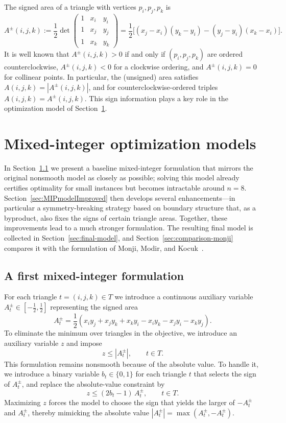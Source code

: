 \documentclass[11pt,a4paper]{article}
\theoremstyle{plain}
\theoremstyle{definition}
\theoremstyle{remark}
\begin{document}
The signed area of a triangle with vertices $p_i,p_j,p_k$ is
\[
  A^\pm(i,j,k)
  :=\frac{1}{2}\det\!\begin{pmatrix}
  1 & x_i & y_i\\
  1 & x_j & y_j\\
  1 & x_k & y_k
  \end{pmatrix}
  =\frac{1}{2}\bigl[(x_j-x_i)(y_k-y_i)-(y_j-y_i)(x_k-x_i)\bigr].
\]
It is well known that $A^\pm(i,j,k)>0$ if and only if $(p_i,p_j,p_k)$ are ordered counterclockwise,
$A^\pm(i,j,k)<0$ for a clockwise ordering, and $A^\pm(i,j,k)=0$ for collinear points.
In particular, the (unsigned) area satisfies $A(i,j,k)=|A^\pm(i,j,k)|$,
and for counterclockwise-ordered triples $A(i,j,k)=A^\pm(i,j,k)$.
This sign information plays a key role in the optimization model of Section~\ref{sec:MIPModel}.

\section{Mixed-integer optimization models}\label{sec:MIPModel}

In Section~\ref{sec:MIPmodelVanilla} we present a baseline mixed-integer formulation that mirrors the original nonsmooth model as closely as possible; solving this model already certifies optimality for small instances but becomes intractable around $n=8$.
Section~\ref{sec:MIPmodelImproved} then develops several enhancements---in particular a symmetry-breaking strategy based on boundary structure that, as a byproduct, also fixes the signs of certain triangle areas.
Together, these improvements lead to a much stronger formulation.
The resulting final model is collected in Section~\ref{sec:final-model}, and Section~\ref{sec:comparison-monji} compares it with the formulation of Monji, Modir, and Kocuk~\cite{monji2025solvingheilbronntriangleproblem}.

\subsection{A first mixed-integer formulation}\label{sec:MIPmodelVanilla}

For each triangle $t=(i,j,k) \in T$ we introduce a continuous auxiliary variable
$A_t^{\pm} \in [-\tfrac{1}{2}, \tfrac{1}{2}]$ representing the signed area
\[
A_t^{\pm}
=
\frac{1}{2}\left(
x_i y_j + x_j y_k + x_k y_i
-
x_i y_k - x_j y_i - x_k y_j
\right).
\]
To eliminate the minimum over triangles in the objective, we introduce an auxiliary variable
$z$ and impose
\[
z \le |A_t^{\pm}|, \qquad t \in T.
\]
This formulation remains nonsmooth because of the absolute value.
To handle it, we introduce a binary variable $b_t\in\{0,1\}$ for each triangle $t$
that selects the sign of $A_t^{\pm}$,
and replace the absolute-value constraint by
\[
z \le (2b_t - 1)\, A_t^{\pm}, \qquad t \in T.
\]
Maximizing $z$ forces the model to choose the sign that yields the larger of $-A_t^\pm$ and $A_t^\pm$, thereby mimicking the absolute value 
$|A_t^\pm|=\max(A_t^\pm,-A_t^\pm)$.
\end{document}
